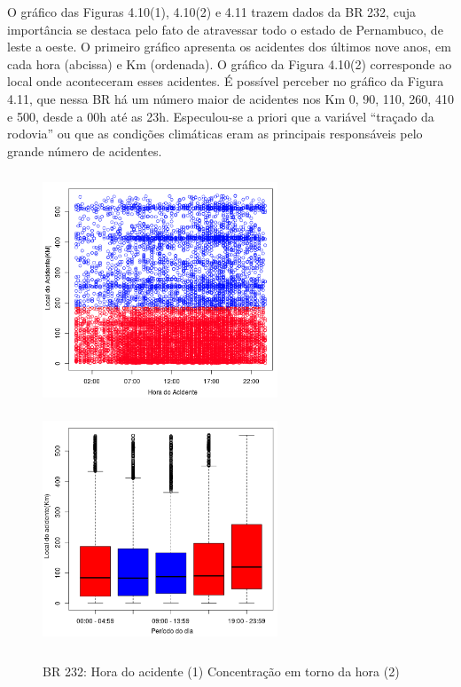\pagebreak

O gráfico das Figuras 4.10(1), 4.10(2)  e 4.11 trazem dados da BR 232, cuja importância se destaca pelo fato de atravessar todo o estado de Pernambuco, de leste a oeste. O primeiro gráfico apresenta os acidentes dos últimos nove anos, em cada hora (abcissa) e Km (ordenada). O  gráfico da Figura 4.10(2) corresponde ao local onde aconteceram esses acidentes. É possível perceber no gráfico da Figura 4.11, que nessa BR há um número maior de acidentes nos Km 0, 90, 110, 260, 410 e 500, desde a 00h até as 23h. 
Especulou-se a priori que a variável “traçado da rodovia” ou que as condições climáticas eram as principais responsáveis pelo grande número de acidentes.

\begin{figure}[h]
	\caption{BR 232: Hora do acidente (1)  Concentração em torno da hora (2)}
	\includegraphics[width=7cm,height=7cm]{Figuras/Preprocess/br232_1.png}
	\includegraphics[width=7cm,height=7cm]{Figuras/Preprocess/br232_32.png}

\end{figure}

